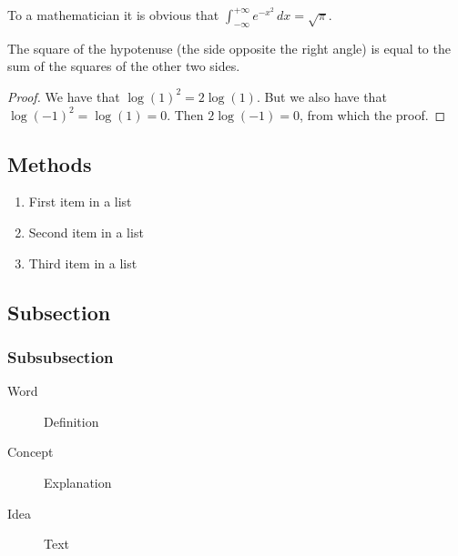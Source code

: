 \begin{definition}[Gauss]
To a mathematician it is obvious that
$\int_{-\infty}^{+\infty}
e^{-x^2}\,dx=\sqrt{\pi}$.
\end{definition}

\begin{theorem}[Pythagoras]
The square of the hypotenuse (the side opposite the right angle) is equal to the sum of the squares of the other two sides.
\end{theorem}

\begin{proof}
We have that $\log(1)^2 = 2\log(1)$.
But we also have that $\log(-1)^2=\log(1)=0$.
Then $2\log(-1)=0$, from which the proof.
\end{proof}

\subsection{Methods}

\lipsum[5] %

\begin{enumerate}[noitemsep] %
\item First item in a list
\item Second item in a list
\item Third item in a list
\end{enumerate}


\subsection{Subsection}

\lipsum[11] %

\subsubsection{Subsubsection}

\lipsum[12] %

\begin{description}
\item[Word] Definition
\item[Concept] Explanation
\item[Idea] Text
\end{description}

\lipsum[12] %

